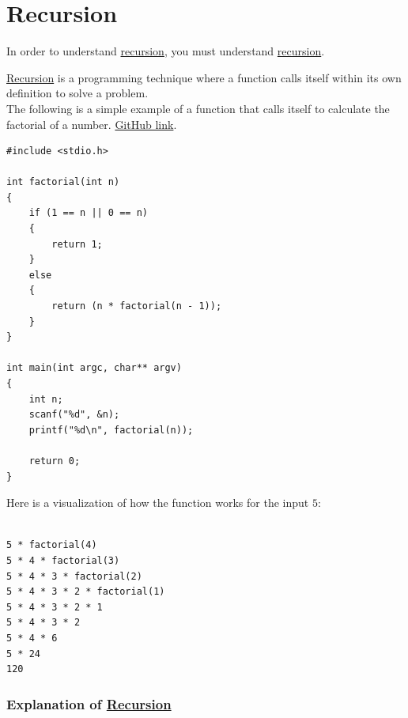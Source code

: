\documentclass[12pt]{article}
\begin{document}
\tableofcontents

\newpage


\part*{\hypertarget{recursion}{Recursion}} \label{recursion}

\begin{center}
    In order to understand \hyperlink{recursion}{recursion}, you must understand \hyperlink{recursion}{recursion}.
\end{center}

\noindent \hyperlink{recursion}{Recursion} is a programming technique where a function calls itself within its own definition to solve a problem. \\

\noindent The following is a simple example of a function that calls itself to calculate the factorial of a number. \href{https://github.com/stmbsnaasmf/PSPF_Lab_08_Spring_2025/blob/main/factorial.c}{GitHub link}.

\begin{verbatim}
#include <stdio.h>

int factorial(int n)
{
    if (1 == n || 0 == n)
    {
        return 1;
    }
    else
    {
        return (n * factorial(n - 1));
    }
}

int main(int argc, char** argv)
{
    int n;
    scanf("%d", &n);
    printf("%d\n", factorial(n));

    return 0;
}
\end{verbatim}

\newpage

\noindent Here is a visualization of how the function works for the input $5$:

\begin{verbatim}

5 * factorial(4)
5 * 4 * factorial(3)
5 * 4 * 3 * factorial(2)
5 * 4 * 3 * 2 * factorial(1)
5 * 4 * 3 * 2 * 1
5 * 4 * 3 * 2
5 * 4 * 6
5 * 24
120

\end{verbatim}

\vspace{1cm}

\section*{Explanation of \hyperlink{recursion}{Recursion}}
\end{document}

